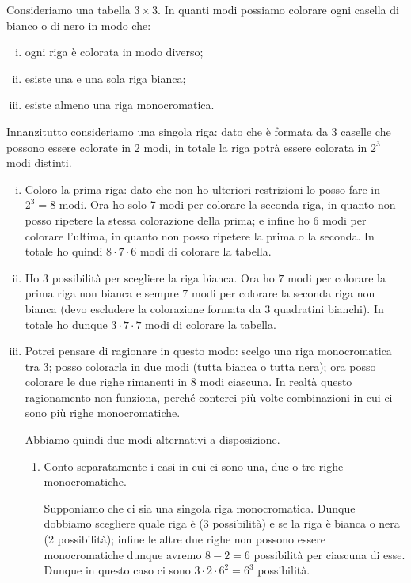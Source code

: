 \begin{example}
    Consideriamo una tabella $3 \times 3$. In quanti modi possiamo colorare ogni casella di bianco o di nero in modo che:
    \begin{enumerate}[(i)]
        \item ogni riga è colorata in modo diverso;
        \item esiste una e una sola riga bianca;
        \item esiste almeno una riga monocromatica.
    \end{enumerate}
\end{example}
\begin{solution}
    Innanzitutto consideriamo una singola riga: dato che è formata da $3$ caselle che possono essere colorate in 2 modi, in totale la riga potrà essere colorata in $2^3$ modi distinti.
    \begin{enumerate}
        [(i)]
        \item Coloro la prima riga: dato che non ho ulteriori restrizioni lo posso fare in $2^3 = 8$ modi. Ora ho solo 7 modi per colorare la seconda riga, in quanto non posso ripetere la stessa colorazione della prima; e infine ho 6 modi per colorare l'ultima, in quanto non posso ripetere la prima o la seconda. In totale ho quindi $8\cdot 7\cdot 6$ modi di colorare la tabella.
        \item Ho $3$ possibilità per scegliere la riga bianca. Ora ho $7$ modi per colorare la prima riga non bianca e sempre 7 modi per colorare la seconda riga non bianca (devo escludere la colorazione formata da 3 quadratini bianchi). In totale ho dunque $3 \cdot 7\cdot 7$ modi di colorare la tabella.
        \item Potrei pensare di ragionare in questo modo: scelgo una riga monocromatica tra 3; posso colorarla in due modi (tutta bianca o tutta nera); ora posso colorare le due righe rimanenti in 8 modi ciascuna. In realtà questo ragionamento non funziona, perché conterei più volte combinazioni in cui ci sono più righe monocromatiche.
        
        Abbiamo quindi due modi alternativi a disposizione. \begin{enumerate}[1.]
            \item Conto separatamente i casi in cui ci sono una, due o tre righe monocromatiche.
            
            Supponiamo che ci sia una singola riga monocromatica. Dunque dobbiamo scegliere quale riga è (3 possibilità) e se la riga è bianca o nera (2 possibilità); infine le altre due righe non possono essere monocromatiche dunque avremo $8-2 = 6$ possibilità per ciascuna di esse. Dunque in questo caso ci sono $3\cdot 2 \cdot 6^2 = 6^3$ possibilità.


\end{enumerate}
\end{enumerate}
\end{solution}
